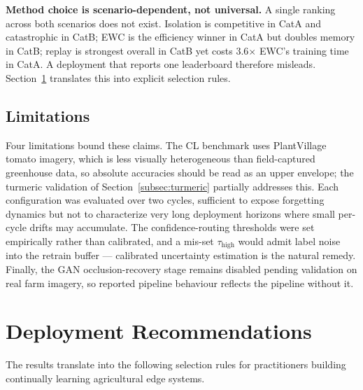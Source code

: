 \documentclass[journal]{IEEEtran}
\begin{document}
\textbf{Method choice is scenario-dependent, not universal.} A single ranking across
both scenarios does not exist. Isolation is competitive in CatA and catastrophic in
CatB; EWC is the efficiency winner in CatA but doubles memory in CatB; replay is
strongest overall in CatB yet costs 3.6$\times$ EWC's training time in CatA. A
deployment that reports one leaderboard therefore misleads. Section~\ref{sec:reco}
translates this into explicit selection rules.

\subsection{Limitations}

Four limitations bound these claims. The CL benchmark uses PlantVillage tomato
imagery, which is less visually heterogeneous than field-captured greenhouse data, so
absolute accuracies should be read as an upper envelope; the turmeric validation of
Section~\ref{subsec:turmeric} partially addresses this. Each configuration was
evaluated over two cycles, sufficient to expose forgetting dynamics but not to
characterize very long deployment horizons where small per-cycle drifts may
accumulate. The confidence-routing thresholds were set empirically rather than
calibrated, and a mis-set $\tau_{\text{high}}$ would admit label noise into the
retrain buffer --- calibrated uncertainty estimation is the natural remedy. Finally,
the GAN occlusion-recovery stage remains disabled pending validation on real farm
imagery, so reported pipeline behaviour reflects the pipeline without it.

\section{Deployment Recommendations}
\label{sec:reco}

The results translate into the following selection rules for practitioners building
continually learning agricultural edge systems.
\end{document}
